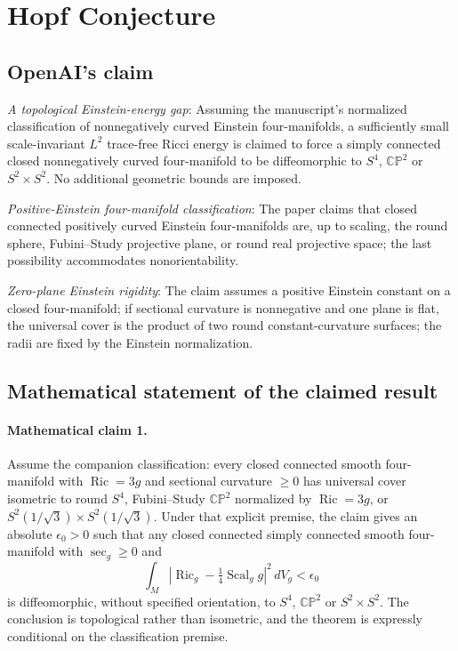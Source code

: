 \documentclass[11pt]{article}
\begin{document}
\section*{Hopf Conjecture}

\subsection{OpenAI's claim}
\textit{A topological Einstein-energy gap}: Assuming the manuscript's normalized classification of nonnegatively curved Einstein four-manifolds, a sufficiently small scale-invariant $L^2$ trace-free Ricci energy is claimed to force a simply connected closed nonnegatively curved four-manifold to be diffeomorphic to $S^4$, $\mathbb{CP}^2$ or $S^2\times S^2$. No additional geometric bounds are imposed.

\textit{Positive-Einstein four-manifold classification}: The paper claims that closed connected positively curved Einstein four-manifolds are, up to scaling, the round sphere, Fubini--Study projective plane, or round real projective space; the last possibility accommodates nonorientability.

\textit{Zero-plane Einstein rigidity}: The claim assumes a positive Einstein constant on a closed four-manifold; if sectional curvature is nonnegative and one plane is flat, the universal cover is the product of two round constant-curvature surfaces; the radii are fixed by the Einstein normalization.

\subsection{Mathematical statement of the claimed result}
\paragraph{Mathematical claim 1.} Assume the companion classification: every closed connected smooth four-manifold with $\operatorname{Ric}=3g$ and sectional curvature $\ge0$ has universal cover isometric to round $S^4$, Fubini--Study $\mathbb{CP}^2$ normalized by $\operatorname{Ric}=3g$, or $S^2(1/\sqrt3)\times S^2(1/\sqrt3)$. Under that explicit premise, the claim gives an absolute $\epsilon_0>0$ such that any closed connected simply connected smooth four-manifold with $\sec_g\ge0$ and \[\int_M\left|\operatorname{Ric}_g-\tfrac14\operatorname{Scal}_g g\right|^2\,dV_g<\epsilon_0\] is diffeomorphic, without specified orientation, to $S^4$, $\mathbb{CP}^2$ or $S^2\times S^2$. The conclusion is topological rather than isometric, and the theorem is expressly conditional on the classification premise.
\end{document}
